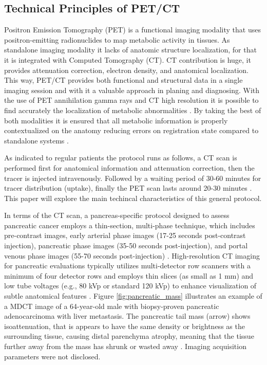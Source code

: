 \begin{multicols}{2}

\subsection{Technical Principles of PET/CT}


Positron Emission Tomography (PET) is a functional imaging modality that uses positron-emitting radionuclides to map metabolic activity in tissues. As standalone imaging modality it lacks of anatomic structure localization, for that it is integrated with Computed Tomography (CT). CT contribution is huge, it provides attenuation correction, electron density, and anatomical localization. This way, PET/CT provides both functional and structural data in a single imaging session and with it a valuable approach in planing and diagnosing. With the use of PET annihilation gamma rays and CT high resolution it is possible to find accurately the localization of metabolic abnormalities \cite{TG174}. By taking the best of both modalities it is ensured that all metabolic information is properly contextualized on the anatomy reducing errors on registration state compared to standalone systems \cite{TG126}.

As indicated to regular patients the protocol runs as follows, a CT scan is performed first for anatomical information and attenuation correction, then the tracer is injected intravenously. Followed by a waiting period of 30-60 minutes for tracer distribution (uptake), finally the PET scan lasts around 20-30 minutes \cite{RadiologyInfoPET}. This paper will explore the main techincal characteristics of this general protocol.


In terms of the CT scan, a pancreas-specific protocol designed to assess pancreatic cancer employs a thin-section, multi-phase technique, which includes pre-contrast images, early arterial phase images (17-25 seconds post-contrast injection), pancreatic phase images (35-50 seconds post-injection), and portal venous phase images (55-70 seconds post-injection) \cite{Lee2014}. High-resolution CT imaging for pancreatic evaluations typically utilizes multi-detector row scanners with a minimum of four detector rows and employs thin slices (as small as 1 mm) and low tube voltages (e.g., 80 kVp or standard 120 kVp) to enhance visualization of subtle anatomical features \cite{Lee2023}. Figure \ref{fig:pancreatic_mass} illustrates an example of a MDCT image of a 64-year-old male with biopsy-proven pancreatic adenocarcinoma with liver metastasis. The pancreatic tail mass (arrow) shows isoattenuation, that is appears to have the same density or brightness as the surrounding tissue, causing distal parenchyma atrophy, meaning that the tissue further away from the mass has shrunk or wasted away \cite{Lee2014}. Imaging acquisition parameters were not disclosed.



\end{multicols}
